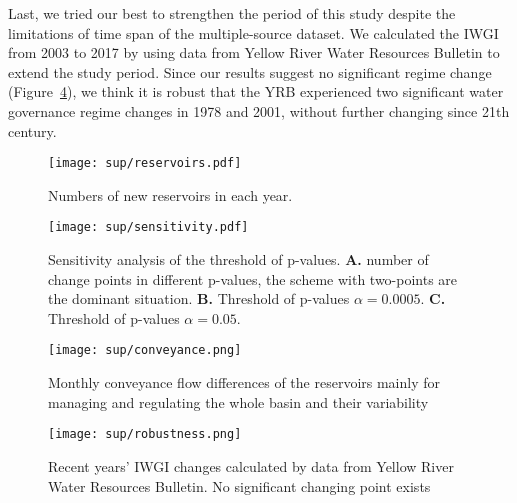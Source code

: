 Last, we tried our best to strengthen the period of this study despite the limitations of time span of the multiple-source dataset. We calculated the IWGI from 2003 to 2017 by using data from Yellow River Water Resources Bulletin to extend the study period. Since our results suggest no significant regime change (Figure~\ref{fig:recent}), we think it is robust that the YRB experienced two significant water governance regime changes in 1978 and 2001, without further changing since 21th century.

\begin{figure}[tb]
    \centering
    \texttt{[image: sup/reservoirs.pdf]}
    \caption{
          Numbers of new reservoirs in each year.
    }\label{fig:reservoirs}
\end{figure}

\begin{figure}
    \centering
    \texttt{[image: sup/sensitivity.pdf]}
    \caption{
          Sensitivity analysis of the threshold of p-values.
          \textbf{A.} number of change points in different p-values, the scheme with two-points are the dominant situation.
          \textbf{B.} Threshold of p-values \(\alpha=0.0005\).
          \textbf{C.} Threshold of p-values \(\alpha=0.05\).
    }\label{fig:sensitivity}
\end{figure}


\begin{figure}[htb]
    \centering
    \texttt{[image: sup/conveyance.png]}
    \caption{Monthly conveyance flow differences of the reservoirs mainly for managing and regulating the whole basin and their variability}\label{fig:conveyance}
\end{figure}


\begin{figure}[!htb]
	\centering
	\texttt{[image: sup/robustness.png]}
	\caption{Recent years' IWGI changes calculated by data from Yellow River Water Resources Bulletin. No significant changing point exists}\label{fig:recent}
\end{figure}
